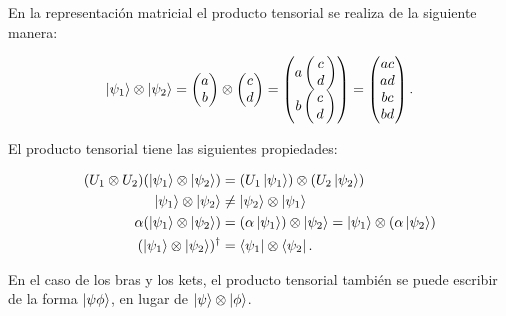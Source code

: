 En la representación matricial el producto tensorial se realiza de la siguiente manera:

\begin{equation*}
    \ket{\psi_1} \otimes \ket{\psi_2} =
    \begin{pmatrix}
        a \\
        b
    \end{pmatrix}
    \otimes
    \begin{pmatrix}
        c \\
        d
    \end{pmatrix}
    =
    \left(\!\!\!\begin{array}{c}
            a \left(\!\!\begin{array}{c}
                    c \\
                    d \\
            \end{array}\!\!\right) \\
            b \left(\!\!\begin{array}{c}
                    c \\
                    d \\
            \end{array}\!\!\right)
    \end{array}\!\!\!\right)
    =
    \begin{pmatrix}
        a c \\
        a d \\
        b c \\
        b d \\
    \end{pmatrix} .
\end{equation*}

El producto tensorial tiene las siguientes propiedades:

\begin{align}
    (U_1 \otimes U_2) (\ket{\psi_1} \otimes \ket{\psi_2}) &= (U_1 \ket{\psi_1}) \otimes (U_2 \ket{\psi_2}) \\
    \ket{\psi_1} \otimes \ket{\psi_2} &\neq \ket{\psi_2} \otimes \ket{\psi_1} \\
    \alpha (\ket{\psi_1} \otimes \ket{\psi_2}) &= (\alpha \ket{\psi_1}) \otimes \ket{\psi_2} = \ket{\psi_1} \otimes (\alpha \ket{\psi_2}) \\
    (\ket{\psi_1} \otimes \ket{\psi_2})^\dagger &= \bra{\psi_1} \otimes \bra{\psi_2} .
\end{align}

En el caso de los bras y los kets, el producto tensorial también se puede escribir de la forma $\ket{\psi\phi}$, en lugar de $\ket{\psi} \otimes \ket{\phi}$.

